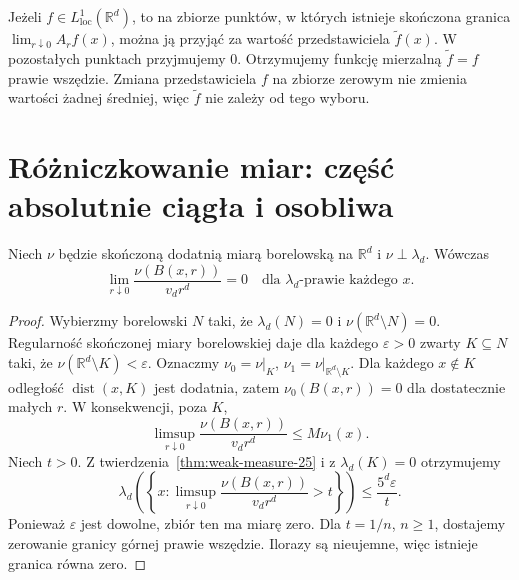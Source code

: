 \begin{przyklad}
Jeżeli $f\in L^1_{\mathrm{loc}}(\mathbb R^d)$, to
na zbiorze punktów, w których istnieje skończona granica
$\lim_{r\downarrow0}A_rf(x)$, można ją przyjąć za
wartość przedstawiciela $\widetilde f(x)$. W pozostałych
punktach przyjmujemy $0$. Otrzymujemy funkcję mierzalną
$\widetilde f=f$ prawie wszędzie. Zmiana przedstawiciela
$f$ na zbiorze zerowym nie zmienia wartości żadnej średniej,
więc $\widetilde f$ nie zależy od tego wyboru.
\end{przyklad}

\section{Różniczkowanie miar: część absolutnie ciągła i osobliwa}
\begin{lemat}
\label{lem:singular-density-25}
Niech $\nu$ będzie skończoną dodatnią miarą borelowską
na $\mathbb R^d$ i $\nu\perp\lambda_d$. Wówczas
\begin{equation}\label{eq:singular-density-25}
 \lim_{r\downarrow0}\frac{\nu(B(x,r))}{v_dr^d}=0
 \quad\text{dla }\lambda_d\text{-prawie każdego }x.
\end{equation}
\end{lemat}
\begin{proof}
Wybierzmy borelowski $N$ taki, że $\lambda_d(N)=0$
i $\nu(\mathbb R^d\setminus N)=0$. Regularność
skończonej miary borelowskiej daje dla każdego
$\varepsilon>0$ zwarty $K\subseteq N$ taki, że
$\nu(\mathbb R^d\setminus K)<\varepsilon$.
Oznaczmy $\nu_0=\nu|_K$, $\nu_1=\nu|_{\mathbb R^d\setminus K}$.
Dla każdego $x\notin K$ odległość $\operatorname{dist}(x,K)$
jest dodatnia, zatem $\nu_0(B(x,r))=0$ dla dostatecznie
małych $r$. W konsekwencji, poza $K$,
\[
 \limsup_{r\downarrow0}\frac{\nu(B(x,r))}{v_dr^d}
 \le M\nu_1(x).
\]
Niech $t>0$. Z twierdzenia~\ref{thm:weak-measure-25}
i z $\lambda_d(K)=0$ otrzymujemy
\[
 \lambda_d\left(\left\{x:\limsup_{r\downarrow0}
 \frac{\nu(B(x,r))}{v_dr^d}>t\right\}\right)
 \le\frac{5^d\varepsilon}{t}.
\]
Ponieważ $\varepsilon$ jest dowolne, zbiór ten ma
miarę zero. Dla $t=1/n$, $n\ge1$, dostajemy
zerowanie granicy górnej prawie wszędzie. Ilorazy są
nieujemne, więc istnieje granica równa zero.
\end{proof}

